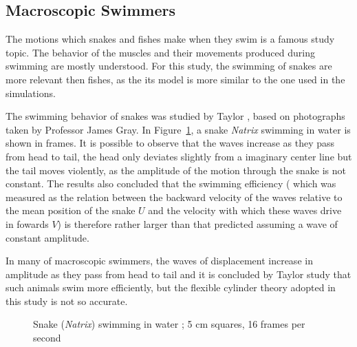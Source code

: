 \subsection{Macroscopic Swimmers}
\label{sec:section 1}


The motions which snakes and fishes make when they swim is a famous study topic\cite{taylor_analysis_1952}. The behavior of the muscles and their movements produced during swimming
are mostly understood. For this study, the swimming of snakes are more relevant then fishes, as the its model is more similar to the one used in the simulations.\par

The swimming behavior of snakes was studied by Taylor \cite{taylor_analysis_1952}, based on photographs taken by Professor James Gray. In Figure~\ref{fig:Bild2.2}, a snake \textit{Natrix} swimming in water is shown in
frames. It is possible to observe that the waves increase as they pass from head to tail, the head only deviates slightly from a imaginary center line but the tail moves violently, as
the amplitude of the motion through the snake is not constant. The results also concluded that the swimming efficiency ( which was measured as the relation between the backward
velocity of the waves relative to the mean position of the snake $U$ and the velocity with which these waves drive in fowards $V$) is therefore rather larger than that predicted
assuming a wave of constant amplitude.\par

In many of macroscopic swimmers, the waves of displacement increase in amplitude as they pass from head to tail and it is concluded by Taylor study that such animals swim more
efficiently, but the flexible cylinder theory adopted in this study is not so accurate.


\begin{figure}[H]
\centering
  \begin{footnotesize}
  
  \caption[Snake (\textit{Natrix}) swimming in water ; 5 cm squares, 16 frames per second \cite{taylor_analysis_1952}]{Snake (\textit{Natrix}) swimming in water ; 5 cm squares, 16 frames per second \cite{taylor_analysis_1952}}
  \label{fig:Bild2.2}
  \end{footnotesize}
\end{figure} 



